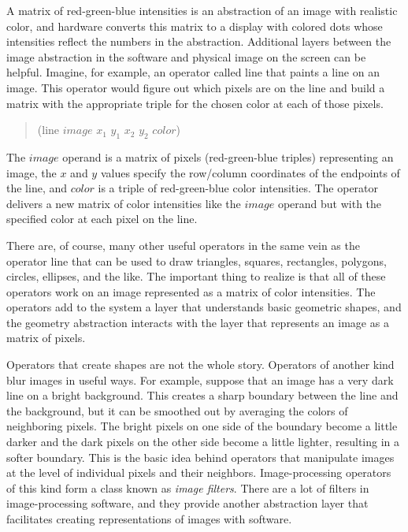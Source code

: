 A matrix of red-green-blue
intensities is an abstraction of an image with realistic color,
and hardware converts this matrix to a display with colored dots
whose intensities reflect the numbers in the abstraction.
Additional layers between the image abstraction in the software and
physical image on the screen can be helpful.
Imagine, for example, an operator called \textsf{line}
that paints a line on an image. This operator would figure out
which pixels are on the line and build a matrix with
the appropriate triple for the chosen color at each of those pixels.
\begin{quote}
    \textsf{(line} $image$ $x_1$ $y_1$ $x_2$ $y_2$ $color$\textsf{)}
\end{quote}
The $image$ operand is a matrix of pixels (red-green-blue triples)
representing an image, the $x$ and $y$ values
specify the row/column coordinates of the endpoints of the line,
and $color$ is a triple of red-green-blue color intensities.
The operator delivers a new matrix of color intensities
like the $image$ operand but with the specified color
at each pixel on the line.

There are, of course, many other useful operators in
the same vein as the operator \textsf{line}
that can be used to draw
triangles, squares, rectangles, polygons, circles,
ellipses, and the like. The important thing to realize is that all of
these operators work on an image represented as a matrix of
color intensities.
The operators add to the system a layer that understands
basic geometric shapes, and the geometry abstraction
interacts with the layer that represents an image as a matrix of pixels.

Operators that create shapes are not the whole story.
Operators of another kind blur images in useful ways.
For example, suppose that an image has a
very dark line on a bright background. This creates a
sharp boundary between the line and the background, but it can be
smoothed out by averaging the colors of neighboring pixels.
The bright pixels on one side of the boundary become a little darker
and the dark pixels on the other side become a little lighter,
resulting in a softer boundary. This is the basic idea behind
operators that manipulate images at the level
of individual pixels and their neighbors. Image-processing operators
of this kind form a class  known as
\emph{image filters}.
There are a lot of filters in image-processing software,
and they provide another abstraction layer
that facilitates creating representations of images with software.

